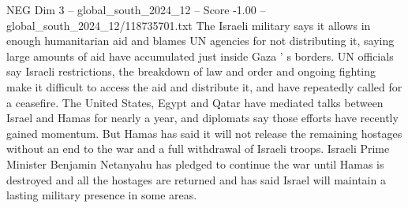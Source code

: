 \begin{textsample}{NEG Dim 3 – global\_south\_2024\_12 – Score -1.00 – global\_south\_2024\_12/118735701.txt}
The Israeli military says it allows in enough humanitarian aid and blames UN agencies for not distributing it, saying large amounts of aid have accumulated just inside Gaza ' s borders.
UN officials say Israeli restrictions, the breakdown of law and order and ongoing fighting make it difficult to access the aid and distribute it, and have repeatedly called for a ceasefire.
The United States, Egypt and Qatar have mediated talks between Israel and Hamas for nearly a year, and diplomats say those efforts have recently gained momentum.
But Hamas has said it will not release the remaining hostages without an end to the war and a full withdrawal of Israeli troops.
Israeli Prime Minister Benjamin Netanyahu has pledged to continue the war until Hamas is destroyed and all the hostages are returned and has said Israel will maintain a lasting military presence in some areas.

\end{textsample}

